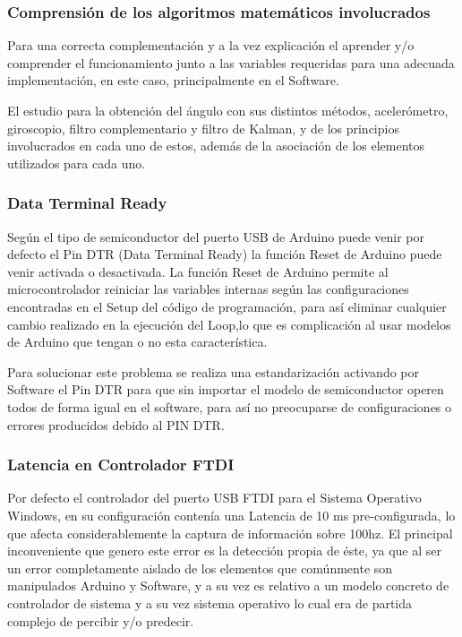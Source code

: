 \documentclass[12pt,a4paper]{article}
\begin{document}
\subsubsection{Comprensión de los algoritmos matemáticos involucrados}
Para una correcta complementación y a la vez explicación el aprender y/o comprender el funcionamiento junto a las variables requeridas para una adecuada implementación, en este caso, principalmente en el Software.

El estudio para la obtención del ángulo con sus distintos métodos, acelerómetro, giroscopio, filtro complementario y filtro de Kalman, y de los principios involucrados en cada uno de estos, además de la asociación de los elementos utilizados para cada uno.

\subsubsection{Data Terminal Ready}
Según el tipo de semiconductor del puerto USB de Arduino puede venir por defecto el Pin DTR (Data Terminal Ready) la función Reset de Arduino puede venir activada o desactivada. 
La función Reset de Arduino permite al microcontrolador reiniciar las variables internas según las configuraciones encontradas en el Setup del código de programación, para así eliminar cualquier cambio realizado en la ejecución del Loop,lo que es complicación al usar modelos de Arduino que tengan o no esta característica.

Para solucionar este problema se realiza una estandarización activando por Software el Pin DTR para que sin importar el modelo de semiconductor operen todos de forma igual en el software, para así no preocuparse de configuraciones o errores producidos debido al PIN DTR.

\subsubsection{Latencia en Controlador FTDI}
Por defecto el controlador del puerto USB FTDI para el Sistema Operativo Windows, en su configuración contenía una Latencia de 10 ms pre-configurada, lo que afecta considerablemente la captura de información sobre 100hz. El principal inconveniente que genero este error es la detección propia de éste, ya que al ser un error completamente aislado de los elementos que comúnmente son manipulados Arduino y Software, y a su vez es relativo a un modelo concreto de controlador de sistema y a su vez sistema operativo lo cual era de partida complejo de percibir y/o predecir.
\end{document}

